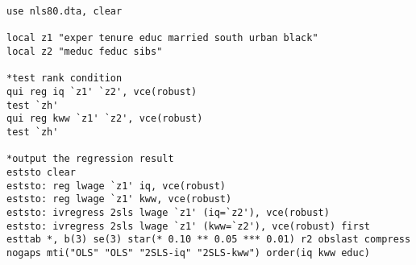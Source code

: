 \begin{lstlisting}
use nls80.dta, clear

local z1 "exper tenure educ married south urban black"
local z2 "meduc feduc sibs"

*test rank condition
qui reg iq `z1' `z2', vce(robust)
test `zh'
qui reg kww `z1' `z2', vce(robust)
test `zh'

*output the regression result
eststo clear
eststo: reg lwage `z1' iq, vce(robust)
eststo: reg lwage `z1' kww, vce(robust)
eststo: ivregress 2sls lwage `z1' (iq=`z2'), vce(robust)
eststo: ivregress 2sls lwage `z1' (kww=`z2'), vce(robust) first
esttab *, b(3) se(3) star(* 0.10 ** 0.05 *** 0.01) r2 obslast compress nogaps mti("OLS" "OLS" "2SLS-iq" "2SLS-kww") order(iq kww educ)
\end{lstlisting}